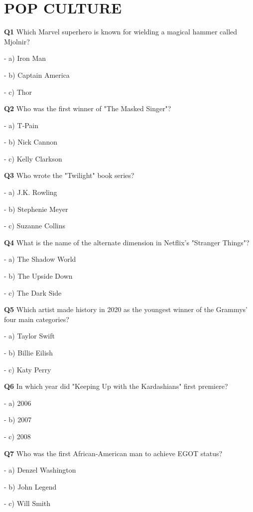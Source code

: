 \section{POP CULTURE}

\textbf{Q1} Which Marvel superhero is known for wielding a magical hammer called Mjolnir?\par
\quad - a) Iron Man\par
\quad - b) Captain America\par
\quad - c) Thor\par

\textbf{Q2} Who was the first winner of "The Masked Singer"?\par
\quad - a) T‑Pain\par
\quad - b) Nick Cannon\par
\quad - c) Kelly Clarkson\par

\textbf{Q3} Who wrote the "Twilight" book series?\par
\quad - a) J.K. Rowling\par
\quad - b) Stephenie Meyer\par
\quad - c) Suzanne Collins\par

\textbf{Q4} What is the name of the alternate dimension in Netflix's "Stranger Things"?\par
\quad - a) The Shadow World\par
\quad - b) The Upside Down\par
\quad - c) The Dark Side\par

\textbf{Q5} Which artist made history in 2020 as the youngest winner of the Grammys' four main categories?\par
\quad - a) Taylor Swift\par
\quad - b) Billie Eilish\par
\quad - c) Katy Perry\par

\textbf{Q6} In which year did "Keeping Up with the Kardashians" first premiere?\par
\quad - a) 2006\par
\quad - b) 2007\par
\quad - c) 2008\par

\textbf{Q7} Who was the first African‑American man to achieve EGOT status?\par
\quad - a) Denzel Washington\par
\quad - b) John Legend\par
\quad - c) Will Smith\par

